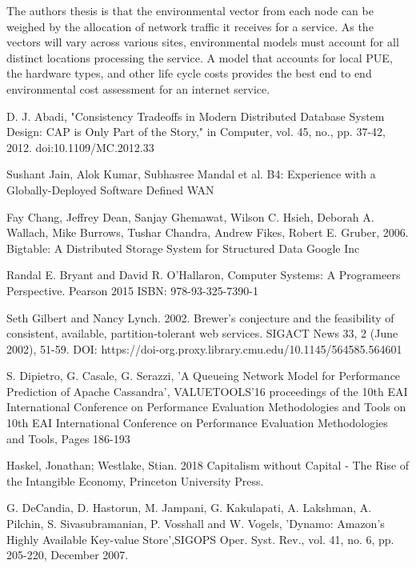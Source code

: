 \documentclass[conference]{IEEEtran}
\begin{document}
The authors thesis is that the environmental vector from each node can be weighed by the allocation of network traffic it receives for a service. As the vectors will vary across various sites, environmental models must account for all distinct locations processing the service. A model that accounts for local PUE, the hardware types, and other life cycle costs provides the best end to end environmental cost assessment for an internet service.

\begin{thebibliography}{00}

 D. J. Abadi, "Consistency Tradeoffs in Modern Distributed Database System Design: CAP is Only Part of the Story," in Computer, vol. 45, no., pp. 37-42, 2012. 
doi:10.1109/MC.2012.33

Sushant Jain, Alok Kumar, Subhasree Mandal et al. B4: Experience with a Globally-Deployed Software Defined WAN

Fay Chang, Jeffrey Dean, Sanjay Ghemawat, Wilson C. Hsieh, Deborah A. Wallach, Mike Burrows, Tushar Chandra, Andrew Fikes, Robert E. Gruber, 2006. Bigtable: A Distributed Storage System for Structured Data  Google Inc

Randal E. Bryant and David R. O'Hallaron, Computer Systems: A Programeers Perspective. Pearson 2015 ISBN: 978-93-325-7390-1

 Seth Gilbert and Nancy Lynch. 2002. Brewer's conjecture and the feasibility of consistent, available, partition-tolerant web services. SIGACT News 33, 2 (June 2002), 51-59. DOI: https://doi-org.proxy.library.cmu.edu/10.1145/564585.564601

S. Dipietro, G. Casale, G. Serazzi, 'A Queueing Network Model for Performance Prediction of Apache Cassandra', VALUETOOLS'16 proceedings of the 10th EAI International Conference on Performance Evaluation Methodologies and Tools on 10th EAI International Conference on Performance Evaluation Methodologies and Tools, Pages 186-193 

Haskel, Jonathan; Westlake, Stian. 2018 Capitalism without Capital - The Rise of the Intangible Economy, Princeton University Press. 

 G. DeCandia, D. Hastorun, M. Jampani, G. Kakulapati,  A. Lakshman, A. Pilchin, S. Sivasubramanian, P. Vosshall  and W. Vogels, 'Dynamo: Amazon’s Highly Available Key-value Store',SIGOPS Oper. Syst. Rev., vol. 41, no. 6, pp. 205-220, December 2007.


\end{thebibliography}
\end{document}
